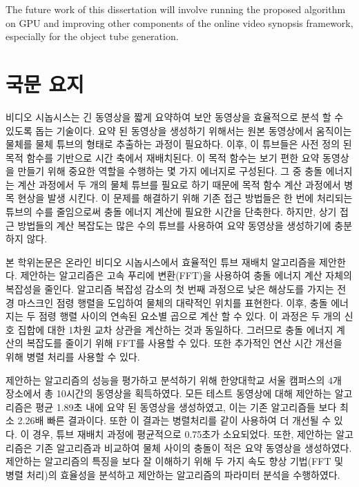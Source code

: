 \documentclass[11pt]{hyu_thesis}
\begin{document}
The future work of this dissertation will involve running the proposed algorithm on GPU and improving other components of the online video synopsis framework, especially for the object tube generation.




\chapter*{국문 요지}

비디오 시놉시스는 긴 동영상을 짧게 요약하여 보안 동영상을 효율적으로 분석 할 수 있도록 돕는 기술이다. 요약 된 동영상을 생성하기 위해서는 원본 동영상에서 움직이는 물체를 물체 튜브의 형태로 추출하는 과정이 필요하다. 이후, 이 튜브들은 사전 정의 된 목적 함수를 기반으로 시간 축에서 재배치된다. 이 목적 함수는 보기 편한 요약 동영상을 만들기 위해 중요한 역할을 수행하는 몇 가지 에너지로 구성된다. 그 중 충돌 에너지는 계산 과정에서 두 개의 물체 튜브를 필요로 하기 때문에 목적 함수 계산 과정에서 병목 현상을 발생 시킨다. 이 문제를 해결하기 위해 기존 접근 방법들은 한 번에 처리되는 튜브의 수를 줄임으로써 충돌 에너지 계산에 필요한 시간을 단축한다. 하지만, 상기 접근 방법들의 계산 복잡도는 많은 수의 튜브를 사용하여 요약 동영상을 생성하기에 충분하지 않다.

본 학위논문은 온라인 비디오 시놉시스에서 효율적인 튜브 재배치 알고리즘을 제안한다. 제안하는 알고리즘은 고속 푸리에 변환(FFT)을 사용하여 충돌 에너지 계산 자체의 복잡성을 줄인다. 알고리즘 복잡성 감소의 첫 번째 과정으로 낮은 해상도를 가지는 전경 마스크인 점령 행렬을 도입하여 물체의 대략적인 위치를 표현한다. 이후, 충돌 에너지는 두 점령 행렬 사이의 연속된 요소별 곱으로 계산 할 수 있다. 이 과정은 두 개의 신호 집합에 대한 1차원 교차 상관을 계산하는 것과 동일하다. 그러므로 충돌 에너지 계산의 복잡도를 줄이기 위해 FFT를 사용할 수 있다. 또한 추가적인 연산 시간 개선을 위해 병렬 처리를 사용할 수 있다.

제안하는 알고리즘의 성능을 평가하고 분석하기 위해 한양대학교 서울 캠퍼스의 4개 장소에서 총 10시간의 동영상을 획득하였다. 모든 테스트 동영상에 대해 제안하는 알고리즘은 평균 1.89초 내에 요약 된 동영상을 생성하였고, 이는 기존 알고리즘들 보다 최소 2.26배 빠른 결과이다. 또한 이 결과는 병렬처리를 같이 사용하여 더 개선될 수 있다. 이 경우, 튜브 재배치 과정에 평균적으로 0.75초가 소요되었다. 또한, 제안하는 알고리즘은 기존 알고리즘과 비교하여 물체 사이의 충돌이 적은 요약 동영상을 생성하였다. 제안하는 알고리즘의 특징을 보다 잘 이해하기 위해 두 가지 속도 향상 기법(FFT 및 병렬 처리)의 효율성을 분석하고 제안하는 알고리즘의 파라미터 분석을 수행하였다.

\end{document}
